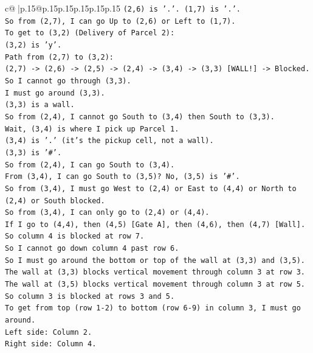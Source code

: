 \documentclass{article}
\begin{document}
{\begin{supertabular}{c@{$\;$}|p{.15\linewidth}@{}p{.15\linewidth}p{.15\linewidth}p{.15\linewidth}p{.15\linewidth}p{.15\linewidth}}
{{{\texttt{(2,6) is '.'. (1,7) is '.'.} \\
\texttt{So from (2,7), I can go Up to (2,6) or Left to (1,7).} \\
\texttt{To get to (3,2) (Delivery of Parcel 2):} \\
\texttt{(3,2) is 'y'.} \\
\texttt{Path from (2,7) to (3,2):} \\
\texttt{(2,7) {-}> (2,6) {-}> (2,5) {-}> (2,4) {-}> (3,4) {-}> (3,3) {[}WALL!{]} {-}> Blocked.} \\
\texttt{So I cannot go through (3,3).} \\
\texttt{I must go around (3,3).} \\
\texttt{(3,3) is a wall.} \\
\texttt{So from (2,4), I cannot go South to (3,4) then South to (3,3).} \\
\texttt{Wait, (3,4) is where I pick up Parcel 1.} \\
\texttt{(3,4) is '.' (it's the pickup cell, not a wall).} \\
\texttt{(3,3) is '\#'.} \\
\texttt{So from (2,4), I can go South to (3,4).} \\
\texttt{From (3,4), I can go South to (3,5)? No, (3,5) is '\#'.} \\
\texttt{So from (3,4), I must go West to (2,4) or East to (4,4) or North to (2,4) or South blocked.} \\
\texttt{So from (3,4), I can only go to (2,4) or (4,4).} \\
\texttt{If I go to (4,4), then (4,5) {[}Gate A{]}, then (4,6), then (4,7) {[}Wall{]}.} \\
\texttt{So column 4 is blocked at row 7.} \\
\texttt{So I cannot go down column 4 past row 6.} \\
\texttt{So I must go around the bottom or top of the wall at (3,3) and (3,5).} \\
\texttt{The wall at (3,3) blocks vertical movement through column 3 at row 3.} \\
\texttt{The wall at (3,5) blocks vertical movement through column 3 at row 5.} \\
\texttt{So column 3 is blocked at rows 3 and 5.} \\
\texttt{To get from top (row 1{-}2) to bottom (row 6{-}9) in column 3, I must go around.} \\
\texttt{Left side: Column 2.} \\
\texttt{Right side: Column 4.} \\
}}}
\end{supertabular}}
\end{document}
